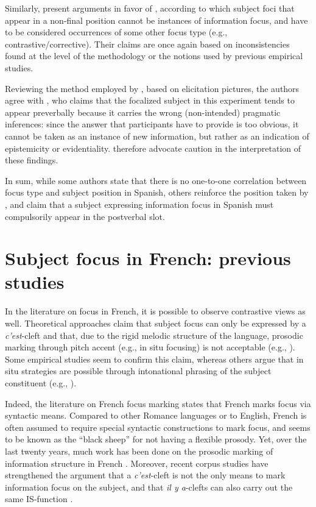 Similarly, \textcite{vidal2019nota} present arguments in favor of \textcite{zubizarreta1998prosody}, according to which subject foci that appear in a non-final position cannot be instances of information focus, and have to be considered occurrences of some other focus type (e.g., contrastive/corrective). Their claims are once again based on inconsistencies found at the level of the methodology or the notions used by previous empirical studies. 

Reviewing the method employed by \textcite{gabriel2007fokus}, based on elicitation pictures, the authors agree with \textcite{uth2014spanish}, who claims that the focalized subject in this experiment tends to appear preverbally because it carries the wrong (non-intended) pragmatic inferences: since the answer that participants have to provide is too obvious, it cannot be taken as an instance of new information, but rather as an indication of epistemicity or evidentiality. \textcite{vidal2019nota} therefore advocate caution in the interpretation of these findings. 

In sum, while some authors state that there is no one-to-one correlation between focus type and subject position in Spanish, others reinforce the position taken by \textcite{zubizarreta1998prosody}, and claim that a subject expressing information focus in Spanish must compulsorily appear in the postverbal slot.
 
 \section{Subject focus in French: previous studies} \label{sub:3.3}
In the literature on focus in French, it is possible to observe contrastive views as well. Theoretical approaches claim that subject focus can only be expressed by a \textit{c'est}-cleft and that, due to the rigid melodic structure of the language, prosodic marking through pitch accent (e.g., in situ focusing) is not acceptable (e.g., \cite{lambrecht1996information}). Some empirical studies seem to confirm this claim, whereas others argue that in situ strategies are possible through intonational phrasing of the subject constituent (e.g., \cite{fery2001focus}). 

Indeed, the literature on French focus marking
states that French marks focus via syntactic means. Compared to other Romance
 languages or  to  English,  French  is  often  assumed  to  require  special syntactic constructions to mark focus, and seems to be known as the ``black sheep” for not having a flexible prosody.  Yet, over the last twenty years, much work has been done  on  the  prosodic  marking of  information  structure  in  French \parencite{jun2000phonological, fery2001focus, beyssade2015prosodic}.
 Moreover, recent corpus studies have strengthened the argument that a \textit{c'est}-cleft is not the only means to mark information focus on the subject, and that \textit{il y a}-clefts can also carry out the same IS-function \parencite{karssenberg2017oiseaux, Karssenberg+2018}. 
 
